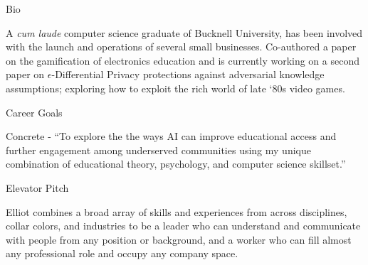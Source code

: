 \documentclass{resume} %
\begin{document}
\begin{rSection}{Bio}

A \textit{cum laude} computer science graduate of Bucknell University, has been involved with the launch and operations of several small businesses. Co-authored a paper on the gamification of electronics education and is currently working on a second paper on $\epsilon$-Differential Privacy protections against adversarial knowledge assumptions; exploring how to exploit the rich world of late ‘80s video games. \\

\end{rSection}


\begin{rSection}{Career Goals}

Concrete - ``To explore the the ways AI can improve educational access and further engagement among underserved communities using my unique combination of educational theory, psychology, and computer science skillset.'' \\

\end{rSection}


\begin{rSection}{Elevator Pitch}

Elliot combines a broad array of skills and experiences from across disciplines, collar colors, and industries to be a leader who can understand and communicate with people from any position or background, and a worker who can fill almost any professional role and occupy any company space. \\

\end{rSection}

\end{document}

